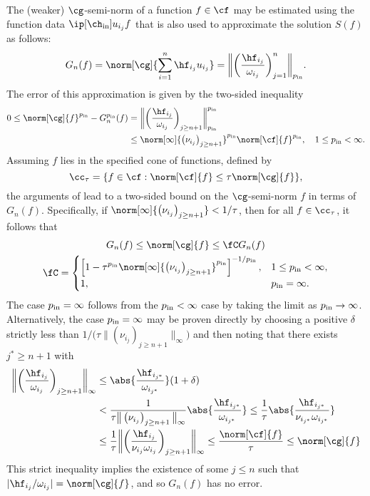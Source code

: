\documentclass[final]{elsarticle}
\newcommand{\chin}{\ch_{\text{\rm{in}}}}
\newcommand{\pin}{p_{\text{\rm{in}}}}
\theoremstyle{definition}
\theoremstyle{remark}
\begin{document}
The (weaker) $\cg$-semi-norm of a function $f \in \cf$ may be estimated using the function data $\ip[\chin]{u_{i_j}}{f}$ that is also used to approximate the solution $S(f)$ as follows:
\begin{equation} \label{genLGalg}
G_n(f) = \norm[\cg]{\sum_{i=1}^n \hf_{i_j} u_{i_j} } = \bigg\lVert\bigg(\frac{\hf_{i_j}}{\omega_{i_j}}\bigg)_{j=1}^n\bigg\rVert_{\pin}.
\end{equation}
The error of this approximation is given by the two-sided inequality
\begin{align*}
0 \le \norm[\cg]{f}^{\pin} - G_n^{\pin}(f)
&= \bigg\lVert\bigg(\frac{\hf_{i_j}}{\omega_{i_j}}\bigg)_{j\ge n+1}\bigg\rVert_{\pin}^{\pin} \\
& \le \norm[\infty]{\left(\nu_{i_j} \right)_{j\ge n+1}}^{\pin} \norm[\cf]{f}^{\pin}, \quad 1 \le \pin <  \infty.
\end{align*}
Assuming $f$ lies in the specified cone of functions, defined by
\begin{equation} \label{FGconedef}
\cc_{\tau} = \{f \in \cf : \norm[\cf]{f} \le \tau \norm[\cg]{f} \},
\end{equation}
the arguments of \cite{HicEtal14b} lead to a two-sided bound on the $\cg$-semi-norm $f$ in terms of $G_n(f)$.  Specifically, if $\norm[\infty]{\left(\nu_{i_j} \right)_{j\ge n+1}} < 1/\tau$, then for all $f \in \cc_{\tau}$,  it follows that
\begin{gather*}
G_n(f)  \le \norm[\cg]{f} \le \fC G_n(f)\\
\fC=\begin{cases}\displaystyle \left[1 - \tau^{\pin} \norm[\infty]{\left(\nu_{i_j} \right)_{j\ge n+1}}^{\pin}\right]^{-1/\pin}, & 1 \le \pin <  \infty, \\
1, & \pin =  \infty.
\end{cases}
\end{gather*}
The case $\pin=\infty$ follows from the $\pin < \infty$ case by taking the limit as $\pin \to \infty$.  Alternatively, the case $\pin=\infty$ may be proven directly by choosing a positive $\delta$ strictly less than $1/\big(\tau \big\lVert\left(\nu_{i_j} \right)_{j\ge n+1}\big\rVert_{\infty}\big)$ and then noting that there exists $j^* \ge n+1$ with
\begin{align*}
\bigg\lVert\bigg(\frac{\hf_{i_j}}{\omega_{i_j}}\bigg)_{j\ge n+1}\bigg\rVert_{\infty}
& \le  \abs{\frac{\hf_{i_{j^*}}}{\omega_{i_{j^*}}}} (1+\delta) \\
& < \frac{1}{\tau \big\lVert\left(\nu_{i_j} \right)_{j\ge n+1}\big\rVert_{\infty}}  \abs{\frac{\hf_{i_{j^*}}}{\omega_{i_{j^*}}}}
\le \frac{1}{\tau } \abs{\frac{\hf_{i_{j^*}}}{\nu_{i_{j^*}} \omega_{i_{j^*}}}}\\
& \le \frac{1}{\tau }\bigg\lVert\bigg(\frac{\hf_{i_j}}{\nu_{i_j}\omega_{i_j}}\bigg)_{j\ge n+1}\bigg\rVert_{\infty} \le \frac{\norm[\cf]{f}}{\tau} \le \norm[\cg]{f}
\end{align*}
This strict inequality implies the existence of some $j \le n$ such that $\lvert\hf_{i_j}/\omega_{i_j} \rvert = \norm[\cg]{f}$, and so $G_n(f)$ has no error.
\end{document}
